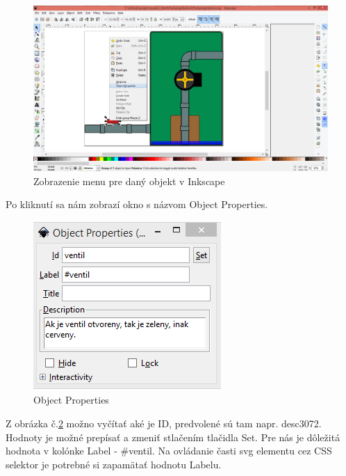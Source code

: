 \begin{figure}[hp]
	\begin{center}
		\includegraphics [width=13cm] {obrazky/obr2.png}
		\caption{Zobrazenie menu pre daný objekt v Inkscape}
		\label{picture2}
	\end{center}
\end{figure}

Po kliknutí sa nám zobrazí okno s názvom Object Properties. 

\begin{figure}[hp]
	\begin{center}
		\includegraphics  {obrazky/obr3.png}
		\caption{Object Properties}
		\label{picture3}
	\end{center}
\end{figure}


Z obrázka č.\ref{picture3} možno vyčítať aké je ID, predvolené sú tam napr. desc3072. Hodnoty je možné prepísať a zmeniť stlačením tlačidla Set. Pre nás je dôležitá hodnota v kolónke Label - \#ventil. 
Na ovládanie časti svg elementu cez CSS selektor je potrebné si zapamätať hodnotu Labelu.  %


